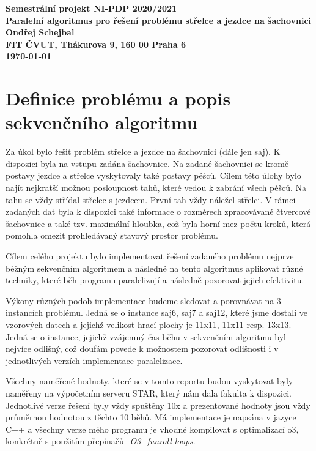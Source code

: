 \documentclass{article} \oddsidemargin=-5mm
\begin{document}
\begin{center}
\bf Semestrální projekt NI-PDP 2020/2021\\[5mm]
    Paralelní algoritmus pro řešení problému střelce a jezdce na šachovnici\\[5mm] 
       Ondřej Schejbal\\[2mm]
FIT ČVUT, Thákurova 9, 160 00 Praha 6\\[2mm]
\today
\end{center}

\section{Definice problému a popis sekvenčního algoritmu}

Za úkol bylo řešit problém střelce a jezdce na šachovnici (dále jen saj). K dispozici byla na vstupu zadána šachovnice. Na zadané šachovnici se kromě postavy jezdce a střelce vyskytovaly také postavy pěšců. Cílem této úlohy bylo najít nejkratší možnou posloupnost tahů, které vedou k zabrání všech pěšců. Na tahu se vždy střídal střelec s jezdcem. První tah vždy náležel střelci. V rámci zadaných dat byla k dispozici také informace o rozměrech zpracovávané čtvercové šachovnice a také tzv. maximální hloubka, což byla horní mez počtu kroků, která pomohla 
omezit prohledávaný stavový prostor problému.

Cílem celého projektu bylo implementovat řešení zadaného problému nejprve běžným sekvenčním algoritmem a následně na tento algoritmus aplikovat různé techniky, které běh programu paralelizují a následně pozorovat jejich efektivitu.

Výkony různých podob implementace budeme sledovat a porovnávat na 3 instancích problému. Jedná se o instance saj6, saj7 a saj12, které jsme dostali ve vzorových datech a jejichž velikost hrací plochy je 11x11, 11x11 resp. 13x13. Jedná se o instance, jejichž vzájemný čas běhu v sekvenčním algoritmu byl nejvíce odlišný, což doufám povede k možnostem pozorovat odlišnosti i v jednotlivých verzích implementace paralelizace.

Všechny naměřené hodnoty, které se v tomto reportu budou vyskytovat byly naměřeny na výpočetním serveru STAR, který nám dala fakulta k dispozici. Jednotlivé verze řešení byly vždy spuštěny 10x a prezentované hodnoty jsou vždy průměrnou hodnotou z těchto 10 běhů. Má implementace je napsána v jazyce C++ a všechny verze mého programu je vhodné kompilovat s optimalizací o3, konkrétně s použitím přepínačů \textit{-O3 -funroll-loops}.
\end{document}
